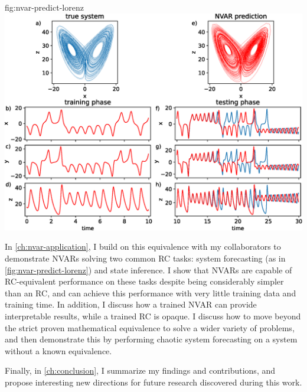 \begin{reusefigure}{fig:nvar-predict-lorenz}
  \includegraphics[width=\textwidth]{figures/nvar-predict-lorenz}
  \caption{The true Lorenz attractor (a) and NVAR predicted attractor
    (e) for a single training trial. (b) -- (d) True Lorenz system
    (blue) during training overlaid with NVAR output (red) calculated
    after training is complete. (f) -- (h) True (blue) and NVAR
    forecasted output (red). The NVAR shows good agreement with the
    true system as far as $5$ Lyapunov periods in to the autonomous
    forecast.}
\end{reusefigure}

In \cref{ch:nvar-application}, I build on this equivalence with my
collaborators to demonstrate NVARs solving two common RC tasks: system
forecasting (as in \cref{fig:nvar-predict-lorenz}) and state inference.
I show that NVARs are capable of
RC-equivalent performance on these tasks despite being considerably
simpler than an RC, and can achieve this performance with very little
training data and training time. In addition, I discuss how a trained
NVAR can provide interpretable results, while a trained RC is
opaque. I discuss how to move beyond the strict proven mathematical
equivalence to solve a wider variety of problems, and then demonstrate
this by performing chaotic system forecasting on a system without a
known equivalence.

Finally, in \cref{ch:conclusion}, I summarize my findings and
contributions, and propose interesting new directions for future
research discovered during this work.
